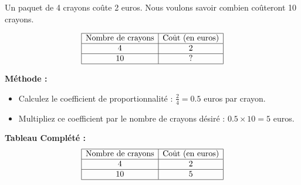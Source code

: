 \documentclass{article}
\begin{document}
\begin{tcolorbox}[colback=orange!10!white, colframe=orange!75!black, title=\textcolor{white}{Exemple 1}, 
                  sharp corners=south]
    Un paquet de 4 crayons coûte 2 euros. Nous voulons savoir combien coûteront 10 crayons.

    \[
    \begin{array}{|c|c|}
    \hline
    \text{Nombre de crayons} & \text{Coût (en euros)} \\
    \hline
    4 & 2 \\
    \hline
    10 & ? \\
    \hline
    \end{array}
    \]

    \textbf{Méthode :}
    \begin{itemize}
        \item Calculez le coefficient de proportionnalité : \(\frac{2}{4} = 0.5\) euros par crayon.
        \item Multipliez ce coefficient par le nombre de crayons désiré : \(0.5 \times 10 = 5\) euros.
    \end{itemize}

    \textbf{Tableau Complété :}
    \[
    \begin{array}{|c|c|}
    \hline
    \text{Nombre de crayons} & \text{Coût (en euros)} \\
    \hline
    4 & 2 \\
    \hline
    10 & 5 \\
    \hline
    \end{array}
    \]
\end{tcolorbox}

\vspace{0.2cm}
\end{document}
